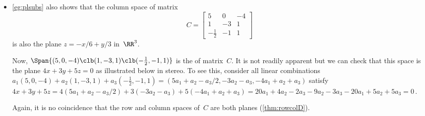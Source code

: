 \begin{example}
\begin{itemize}
\item \cref{eg:plsubs} also shows that the column space of matrix
\begin{equation*}
C=\begin{bmatrix} 5&0&-4\\1&-3&1\\-\frac12&-1&1 \end{bmatrix}
\end{equation*}
is also the plane \(z=-x/6+y/3\) in~\(\RR^3\).

Now, \(\Span\{(5,0,-4)\clb (1,-3,1)\clb (-\frac12,-1,1)\}\) is the  of matrix~\(C\).
It is not readily apparent but we can check that this space is the plane \(4x+3y+5z=0\) as illustrated below in stereo.
To see this, consider all linear combinations \(a_1(5,0,-4)+a_2(1,-3,1)+a_3(-\frac12,-1,1)
=(5a_1+a_2-a_3/2, -3a_2-a_3, -4a_1+a_2+a_3)\) satisfy
\(4x+3y+5z
=4(5a_1+a_2-a_3/2)+3(-3a_2-a_3)+5(-4a_1+a_2+a_3)
=20a_1+4a_2-2a_3-9a_2-3a_3-20a_1+5a_2+5a_3
=0\)\,.
\begin{center}
%
\end{center}
Again, it is no coincidence that the row and column spaces of~\(C\) are both planes (\cref{thm:rowcolD}).
\end{itemize}
\end{example}





